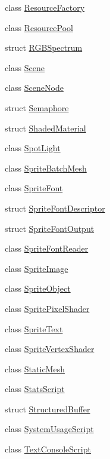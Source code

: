 \begin{DoxyCompactItemize}
\item 
class \hyperlink{classmage_1_1_resource_factory}{Resource\+Factory}
\item 
class \hyperlink{classmage_1_1_resource_pool}{Resource\+Pool}
\item 
struct \hyperlink{structmage_1_1_r_g_b_spectrum}{R\+G\+B\+Spectrum}
\item 
class \hyperlink{classmage_1_1_scene}{Scene}
\item 
class \hyperlink{classmage_1_1_scene_node}{Scene\+Node}
\item 
struct \hyperlink{structmage_1_1_semaphore}{Semaphore}
\item 
struct \hyperlink{structmage_1_1_shaded_material}{Shaded\+Material}
\item 
class \hyperlink{classmage_1_1_spot_light}{Spot\+Light}
\item 
class \hyperlink{classmage_1_1_sprite_batch_mesh}{Sprite\+Batch\+Mesh}
\item 
class \hyperlink{classmage_1_1_sprite_font}{Sprite\+Font}
\item 
struct \hyperlink{structmage_1_1_sprite_font_descriptor}{Sprite\+Font\+Descriptor}
\item 
struct \hyperlink{structmage_1_1_sprite_font_output}{Sprite\+Font\+Output}
\item 
class \hyperlink{classmage_1_1_sprite_font_reader}{Sprite\+Font\+Reader}
\item 
class \hyperlink{classmage_1_1_sprite_image}{Sprite\+Image}
\item 
class \hyperlink{classmage_1_1_sprite_object}{Sprite\+Object}
\item 
class \hyperlink{classmage_1_1_sprite_pixel_shader}{Sprite\+Pixel\+Shader}
\item 
class \hyperlink{classmage_1_1_sprite_text}{Sprite\+Text}
\item 
class \hyperlink{classmage_1_1_sprite_vertex_shader}{Sprite\+Vertex\+Shader}
\item 
class \hyperlink{classmage_1_1_static_mesh}{Static\+Mesh}
\item 
class \hyperlink{classmage_1_1_stats_script}{Stats\+Script}
\item 
struct \hyperlink{structmage_1_1_structured_buffer}{Structured\+Buffer}
\item 
class \hyperlink{classmage_1_1_system_usage_script}{System\+Usage\+Script}
\item 
class \hyperlink{classmage_1_1_text_console_script}{Text\+Console\+Script}
\item 

\end{DoxyCompactItemize}

